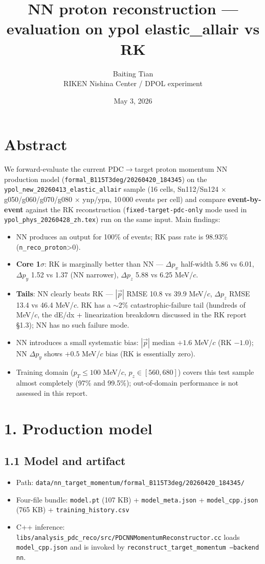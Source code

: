 \documentclass[a4paper,11pt]{article}
\title{\textbf{NN proton reconstruction --- evaluation on ypol elastic\_allair vs RK}}
\author{Baiting Tian \\ RIKEN Nishina Center / DPOL experiment}
\date{May 3, 2026}
\begin{document}
\maketitle

\section*{Abstract}
We forward-evaluate the current PDC$\to$target proton momentum NN production model
(\texttt{formal\_B115T3deg/20260420\_184345}) on the
\texttt{ypol\_new\_20260413\_elastic\_allair} sample (16 cells, Sn112/Sn124 $\times$ g050/g060/g070/g080 $\times$ ynp/ypn,
10\,000 events per cell) and compare \textbf{event-by-event} against the RK reconstruction
(\texttt{fixed-target-pdc-only} mode used in \texttt{ypol\_phys\_20260428\_zh.tex}) run on the same input.
Main findings:
\begin{itemize}[nosep]
    \item NN produces an output for 100\% of events; RK pass rate is 98.93\% (\texttt{n\_reco\_proton}>0).
    \item \textbf{Core 1$\sigma$}: RK is marginally better than NN --- $\Delta p_x$ half-width 5.86 vs 6.01, $\Delta p_y$ 1.52 vs 1.37 (NN narrower), $\Delta p_z$ 5.88 vs 6.25 MeV/$c$.
    \item \textbf{Tails}: NN clearly beats RK --- $|\vec p|$ RMSE 10.8 vs 39.9 MeV/$c$, $\Delta p_z$ RMSE 13.4 vs 46.4 MeV/$c$. RK has a $\sim$2\% catastrophic-failure tail (hundreds of MeV/$c$, the dE/dx + linearization breakdown discussed in the RK report \S1.3); NN has no such failure mode.
    \item NN introduces a small systematic bias: $|\vec p|$ median $+1.6$ MeV/$c$ (RK $-1.0$); NN $\Delta p_y$ shows $+0.5$ MeV/$c$ bias (RK is essentially zero).
    \item Training domain ($p_T \le 100$ MeV/$c$, $p_z \in [560, 680]$) covers this test sample almost completely (97\% and 99.5\%); out-of-domain performance is not assessed in this report.
\end{itemize}

\section{1. Production model}

\subsection{1.1 Model and artifact}
\begin{itemize}[nosep]
    \item Path: \texttt{data/nn\_target\_momentum/formal\_B115T3deg/20260420\_184345/}
    \item Four-file bundle: \texttt{model.pt} (107 KB) + \texttt{model\_meta.json} + \texttt{model\_cpp.json} (765 KB) + \texttt{training\_history.csv}
    \item C++ inference: \texttt{libs/analysis\_pdc\_reco/src/PDCNNMomentumReconstructor.cc} loads \texttt{model\_cpp.json} and is invoked by \texttt{reconstruct\_target\_momentum --backend nn}.
\end{itemize}
\end{document}
